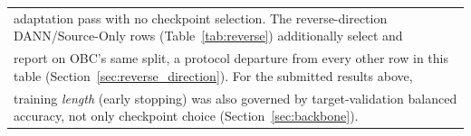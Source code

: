 \begin{table}[t]
\begin{tabular}{llccclc}
\multicolumn{7}{l}{\footnotesize adaptation pass with no checkpoint selection. The reverse-direction DANN/Source-Only rows (Table~\ref{tab:reverse}) additionally select and} \\
\multicolumn{7}{l}{\footnotesize report on OBC's same split, a protocol departure from every other row in this table (Section~\ref{sec:reverse_direction}). For the submitted results above,} \\
\multicolumn{7}{l}{\footnotesize training \emph{length} (early stopping) was also governed by target-validation balanced accuracy, not only checkpoint choice (Section~\ref{sec:backbone}).} \\
\bottomrule
\end{tabular}
\end{table}
